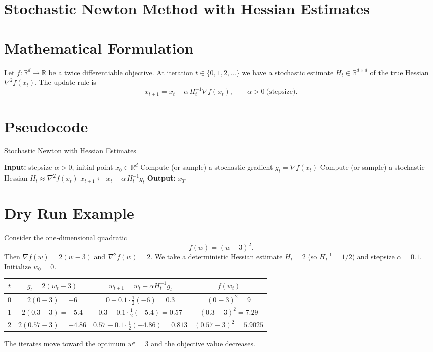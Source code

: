 \documentclass{article}
\newcommand{\R}{\mathbb{R}}
\begin{document}
\section*{Stochastic Newton Method with Hessian Estimates}

\section*{Mathematical Formulation}
Let $f:\R^{d}\rightarrow\R$ be a twice differentiable objective.  
At iteration $t\in\{0,1,2,\dots\}$ we have a stochastic estimate $H_{t}\in\R^{d\times d}$ of the true Hessian $\nabla^{2}f(x_{t})$.  
The update rule is
\[
x_{t+1}=x_{t}-\alpha\, H_{t}^{-1}\nabla f(x_{t}),\qquad \alpha>0\ \text{(stepsize)}.
\tag{1}
\]

\section*{Pseudocode}
\begin{algorithm}[H]
\caption{Stochastic Newton with Hessian Estimates}
\begin{algorithmic}[1]
\State \textbf{Input:} stepsize $\alpha>0$, initial point $x_{0}\in\R^{d}$
    \State Compute (or sample) a stochastic gradient $g_{t}= \nabla f(x_{t})$ 
    \State Compute (or sample) a stochastic Hessian $H_{t}\approx \nabla^{2}f(x_{t})$
    \State $x_{t+1}\gets x_{t}-\alpha\, H_{t}^{-1}g_{t}$
\EndFor
\State \textbf{Output:} $x_{T}$
\end{algorithmic}
\end{algorithm}

\section*{Dry Run Example}
Consider the one‑dimensional quadratic 
\[
f(w)=(w-3)^{2}.
\]
Then $\nabla f(w)=2(w-3)$ and $\nabla^{2}f(w)=2$.  
We take a deterministic Hessian estimate $H_{t}=2$ (so $H_{t}^{-1}=1/2$) and stepsize $\alpha=0.1$.  
Initialize $w_{0}=0$.

\begin{center}
\begin{tabular}{c|c|c|c}
$t$ & $g_{t}=2(w_{t}-3)$ & $w_{t+1}=w_{t}-\alpha H_{t}^{-1}g_{t}$ & $f(w_{t})$\\ \hline
0 & $2(0-3)=-6$ & $0-0.1\cdot\frac{1}{2}(-6)=0.3$ & $(0-3)^{2}=9$\\
1 & $2(0.3-3)=-5.4$ & $0.3-0.1\cdot\frac{1}{2}(-5.4)=0.57$ & $(0.3-3)^{2}=7.29$\\
2 & $2(0.57-3)=-4.86$ & $0.57-0.1\cdot\frac{1}{2}(-4.86)=0.813$ & $(0.57-3)^{2}=5.9025$\\
\end{tabular}
\end{center}
The iterates move toward the optimum $w^{\star}=3$ and the objective value decreases.
\end{document}
